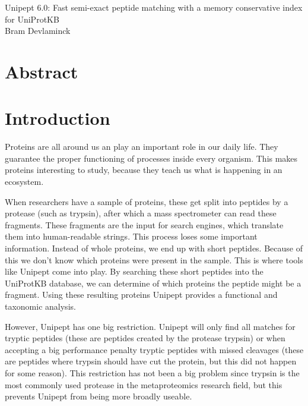 \documentclass[11pt]{article}
\begin{document}
    \begingroup
    \centering
    \LARGE Unipept 6.0: Fast semi-exact peptide matching with a memory conservative index for UniProtKB\\[1em]
    \large Bram Devlaminck\\[2em]
    \endgroup

    \begin{multicols}{2}
        \section*{Abstract}\label{sec:test-section}


        \section{Introduction}\label{sec:introduction}
        Proteins are all around us an play an important role in our daily life.
        They guarantee the proper functioning of processes inside every organism.
        This makes proteins interesting to study, because they teach us what is happening in an ecosystem.

        When researchers have a sample of proteins, these get split into peptides by a protease (such as trypsin), after which a mass spectrometer can read these fragments.
        These fragments are the input for search engines, which translate them into human-readable strings.
        This process loses some important information.
        Instead of whole proteins, we end up with short peptides.
        Because of this we don't know which proteins were present in the sample.
        This is where tools like Unipept come into play.
        By searching these short peptides into the UniProtKB database, we can determine of which proteins the peptide might be a fragment.
        Using these resulting proteins Unipept provides a functional and taxonomic analysis.

        However, Unipept has one big restriction.
        Unipept will only find all matches for tryptic peptides (these are peptides created by the protease trypsin) or when accepting a big performance penalty tryptic peptides with missed cleavages (these are peptides where trypsin should have cut the protein, but this did not happen for some reason).
        This restriction has not been a big problem since trypsin is the most commonly used protease in the metaproteomics research field, but this prevents Unipept from being more broadly useable.


\end{multicols}
\end{document}
